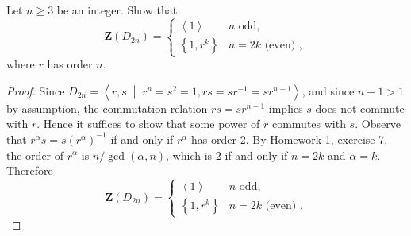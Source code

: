 \documentclass[10pt]{amsart}
\newcommand{\cntr}[1]{\mathbf{Z}\left(#1\right)}
\begin{document}
\begin{thm}
  Let $n \geq 3$ be an integer.
  Show that 
  $$\cntr{D_{2n}} = \left\{\begin{array}{ll}
  \left<1\right> & n \text{ odd},\\
  \left\{1, r^k\right\} & n = 2k \text{ (even) },
  \end{array}\right.$$
  where $r$ has order $n$.
  \begin{proof}
    Since $D_{2n} = \left<r,s \;\middle\vert\; r^n = s^2 = 1, rs = sr^{-1} = sr^{n-1} \right>$, and since $n - 1 > 1$ by assumption, the commutation relation $rs = sr^{n-1}$ implies $s$ does not commute with $r$.
    Hence it suffices to show that some power of $r$ commutes with $s$.
    Observe that $r^\alpha s = s(r^\alpha)^{-1}$ if and only if $r^\alpha$ has order 2.
    By Homework 1, exercise 7, the order of $r^\alpha$ is $n/\gcd(\alpha,n)$, which is 2 if and only if $n = 2k$ and $\alpha = k$.
    Therefore   $$\cntr{D_{2n}} = \left\{\begin{array}{ll}
    \left<1\right> & n \text{ odd},\\
    \left\{1, r^k\right\} & n = 2k \text{ (even) }.
    \end{array}\right.$$
  \end{proof}
\end{thm}
\end{document}
